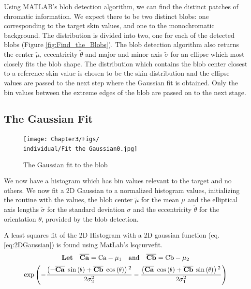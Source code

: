 Using MATLAB's blob detection algorithm, we can find the distinct patches of chromatic information. We expect there to be two distinct blobs: one corresponding to the target skin values, and one to the monochromatic background. The distribution is divided into two, one for each of the detected blobs (Figure \ref{fig:Find_the_Blobs}). The blob detection algorithm also returns the center $\widetilde{\mu}$, eccentricity $\widetilde{\theta}$ and major and minor axis $\widetilde{\sigma}$ for an ellipse which most closely fits the blob shape. The distribution which contains the blob center closest to a reference skin value is chosen to be the skin distribution and the ellipse values are passed to the next step where the Gaussian fit is obtained. Only the bin values between the extreme edges of the blob are passed on to the next stage.

\subsection{The Gaussian Fit}\label{sec:TheGaussianFit}

\begin{figure}[h!] %
  \centering
    \texttt{[image: Chapter3/Figs/\\individual/Fit\_the\_Gaussian0.jpg]}
        \caption{The Gaussian fit to the blob}  \label{fig:Fit_the_Gaussian0}
    \end{figure}


We now have a histogram which has bin values relevant to the target and no others. We now fit a 2D Gaussian to a normalized histogram values, initializing the routine with the values, the blob center $\widetilde{\mu}$ for the mean $\mu$ and the  elliptical axis lengths $\widetilde{\sigma}$ for the standard deviation $\sigma$  and the eccentricity $\widetilde{\theta}$  for the orientation $\theta$, provided by the blob detection.

A least squares fit of the 2D Histogram with a 2D gaussian function (eq. \ref{eq:2DGaussian})  is found using MatLab's lsqcurvefit.
\newcommand{\CaMu}{ \overline{\mathbf{Ca}} }
\newcommand{\CbMu}{\overline{\mathbf{Cb}}  }
\begin{gather}\label{eq:2DGaussian}
\textbf{Let} \quad \CaMu = \text{Ca}-\mu_1 \quad \text{and} \quad \CbMu = \text{Cb}-\mu_2 \\
\exp \left(
-\frac{\left( - \CaMu \; \sine{     \theta } + \CbMu \; \cosine{ \theta } \right){}^2}{2 \sigma_2^2} - 
\frac{\left(      \CaMu \; \cosine{ \theta } + \CbMu \; \sine{      \theta} \right){}^2}{2 \sigma_1^2} \right)
\end{gather}



